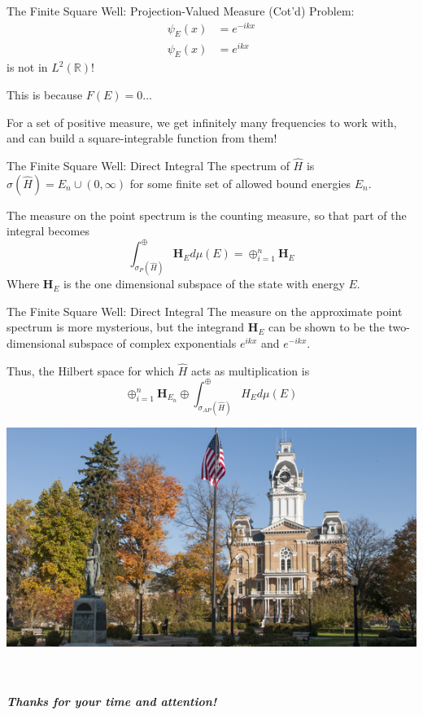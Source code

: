 \documentclass{beamer}
\begin{document}
\begin{frame}{The Finite Square Well: Projection-Valued Measure (Cot'd)}
    Problem:
    \[
        \begin{aligned}
            \psi_{E}(x) &= e^{-ikx} \\
            \psi_{E}(x) &= e^{ikx}
        \end{aligned}
    \]
    is not in $L^2(\mathbb{R})$!

    \pause

    This is because $F(E) = 0$...

    \pause

    For a set of positive measure, we get infinitely many frequencies to work
    with, and can build a square-integrable function from them!
\end{frame}
\begin{frame}{The Finite Square Well: Direct Integral}
    The spectrum of $\hat{H}$ is $\sigma(\hat{H}) = {E_n}\cup(0,\infty)$ for
    some finite set of allowed bound energies $E_n$.

    The measure on the point spectrum is the counting measure, so that part of
    the integral becomes
    \[
        \int_{\sigma_P(\hat{H})}^{\oplus}\textbf{H}_{E}d\mu(E) =
        \oplus_{i=1}^{n} \textbf{H}_{E}
    \]
Where $\textbf{H}_E$ is the one dimensional subspace of the state with energy
    $E$.
\end{frame}

\begin{frame}{The Finite Square Well: Direct Integral}
    The measure on the approximate point spectrum is more mysterious, but the
    integrand $\textbf{H}_E$ can be shown to be the two-dimensional subspace of
    complex exponentials $e^{ikx}$ and $e^{-ikx}$.

    Thus, the Hilbert space for which $\hat{H}$ acts as multiplication is
    \[
        \oplus_{i=1}^n \textbf{H}_{E_n} \oplus
        \int_{\sigma_{AP}(\hat{H})}^{\oplus} H_Ed\mu(E)
    \]
\end{frame}
\begin{frame}
\begin{center}
\includegraphics[scale=1.7]{Hillsdale}
\end{center}
\begin{center}
\emph{\textbf{\ \\ \ \\Thanks for your time and attention!}}
\end{center}
\end{frame}
\end{document}
